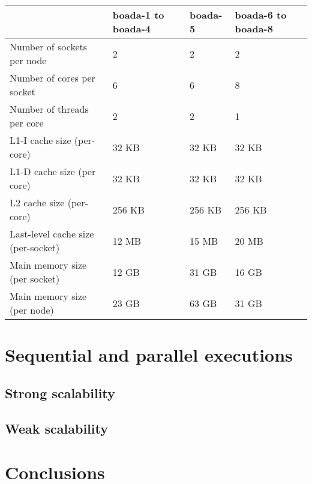 \documentclass[12]{article}
\begin{document}
\begin{table}[h]
    \begin{tabular}{|l||l|l|l|}
    \hline
                                        & boada-1 to boada-4    & boada-5   & boada-6 to boada-8    \\
    \hline\hline
    Number of sockets per node          & 2                     & 2         & 2                     \\
    \hline
    Number of cores per socket          & 6                     & 6         & 8                     \\
    \hline
    Number of threads per core          & 2                     & 2         & 1                     \\
    \hline
    L1-I cache size (per-core)          & 32 KB                 & 32 KB     & 32 KB                 \\    
    \hline
    L1-D cache size (per core)          & 32 KB                 & 32 KB     & 32 KB                 \\
    \hline
    L2 cache size (per-core)            & 256 KB                & 256 KB    & 256 KB                \\
    \hline
    Last-level cache size (per-socket)  & 12 MB                 & 15 MB     & 20 MB                 \\
    \hline
    Main memory  size (per socket)      & 12 GB                 & 31 GB     & 16 GB                 \\
    \hline
    Main memory size (per node)         & 23 GB                 & 63 GB     & 31 GB                 \\
    \hline
    \end{tabular}
\end{table}




\section{Sequential and parallel executions}
\subsection{Strong scalability}
\subsection{Weak scalability}
\section{Conclusions}
\end{document}
